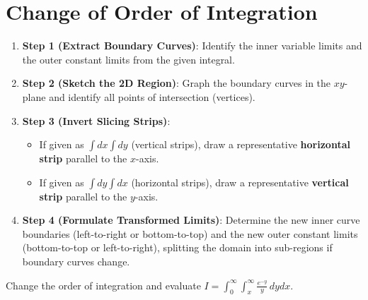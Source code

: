 \section{Change of Order of Integration}

\begin{methodbox}
\begin{enumerate}[leftmargin=1.5em]
    \item \textbf{Step 1 (Extract Boundary Curves)}: Identify the inner variable limits and the outer constant limits from the given integral.
    \item \textbf{Step 2 (Sketch the 2D Region)}: Graph the boundary curves in the $xy$-plane and identify all points of intersection (vertices).
    \item \textbf{Step 3 (Invert Slicing Strips)}:
    \begin{itemize}
        \item If given as $\int dx \int dy$ (vertical strips), draw a representative \textbf{horizontal strip} parallel to the $x$-axis.
        \item If given as $\int dy \int dx$ (horizontal strips), draw a representative \textbf{vertical strip} parallel to the $y$-axis.
    \end{itemize}
    \item \textbf{Step 4 (Formulate Transformed Limits)}: Determine the new inner curve boundaries (left-to-right or bottom-to-top) and the new outer constant limits (bottom-to-top or left-to-right), splitting the domain into sub-regions if boundary curves change.
\end{enumerate}
\end{methodbox}

\begin{example}
Change the order of integration and evaluate $I = \int_0^\infty \int_x^\infty \frac{e^{-y}}{y}\,dy dx$.
\end{example}

